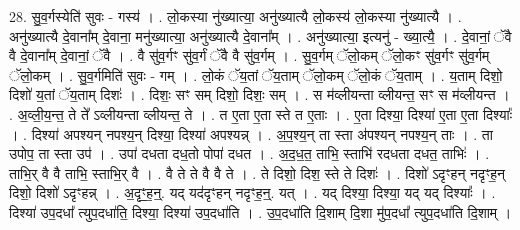 \documentclass[17pt]{extarticle}
\begin{document}
28. सु॒व॒र्गस्येति॑ सुवः - गस्य॑ । . लो॒कस्या नु॑ख्यात्या॒ अनु॑ख्यात्यै लो॒कस्य॑ लो॒कस्या नु॑ख्यात्यै । . अनु॑ख्यात्यै दे॒वाना᳚म् दे॒वाना॒ मनु॑ख्यात्या॒ अनु॑ख्यात्यै दे॒वाना᳚म् । . अनु॑ख्यात्या॒ इत्यनु॑ - ख्या॒त्यै॒ । . दे॒वानां॒ ॅवै वै दे॒वाना᳚म् दे॒वानां॒ ॅवै । . वै सु॑व॒र्गꣳ सु॑व॒र्गं ॅवै वै सु॑व॒र्गम् । . सु॒व॒र्गम् ॅलो॒कम् ॅलो॒कꣳ सु॑व॒र्गꣳ सु॑व॒र्गम् ॅलो॒कम् । . सु॒व॒र्गमिति॑ सुवः - गम् । . लो॒कं ॅय॒तां ॅय॒ताम् ॅलो॒कम् ॅलो॒कं ॅय॒ताम् । . य॒ताम् दिशो॒ दिशो॑ य॒तां ॅय॒ताम् दिशः॑ । . दिशः॒ सꣳ सम् दिशो॒ दिशः॒ सम् । . स म॑व्लीयन्ता व्लीयन्त॒ सꣳ स म॑व्लीयन्त । . अ॒व्ली॒य॒न्त॒ ते ते᳚ ऽव्लीयन्ता व्लीयन्त॒ ते । . त ए॒ता ए॒ता स्ते त ए॒ताः । . ए॒ता दिश्या॒ दिश्या॑ ए॒ता ए॒ता दिश्याः᳚ । . दिश्या॑ अपश्यन् नपश्य॒न् दिश्या॒ दिश्या॑ अपश्यन्न् । . अ॒प॒श्य॒न् ता स्ता अ॑पश्यन् नपश्य॒न् ताः । . ता उपोप॒ ता स्ता उप॑ । . उपा॑ दधता दध॒तो पोपा॑ दधत । . अ॒द॒ध॒त॒ ताभि॒ स्ताभि॑ रदधता दधत॒ ताभिः॑ । . ताभि॒र् वै वै ताभि॒ स्ताभि॒र् वै । . वै ते ते वै वै ते । . ते दिशो॒ दिश॒ स्ते ते दिशः॑ । . दिशो॑ ऽदृꣳहन् नदृꣳह॒न् दिशो॒ दिशो॑ ऽदृꣳहन्न् । . अ॒दृꣳ॒॒ह॒न्॒. यद् यद॑दृꣳहन् नदृꣳह॒न्॒. यत् । . यद् दिश्या॒ दिश्या॒ यद् यद् दिश्याः᳚ । . दिश्या॑ उप॒दधा᳚ त्युप॒दधा॑ति॒ दिश्या॒ दिश्या॑ उप॒दधा॑ति । . उ॒प॒दधा॑ति दि॒शाम् दि॒शा मु॑प॒दधा᳚ त्युप॒दधा॑ति दि॒शाम् । \newline
\end{document}
